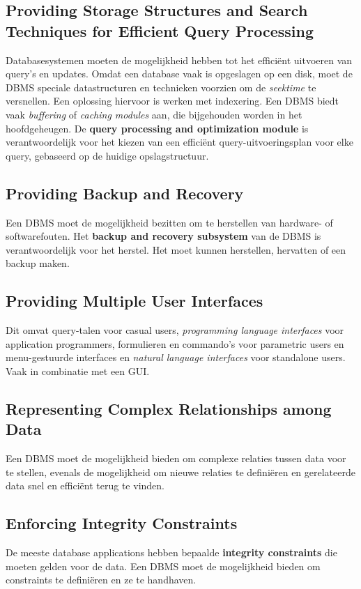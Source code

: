 \subsection{Providing Storage Structures and Search Techniques for Efficient Query Processing}
Databasesystemen moeten de mogelijkheid hebben tot het effici\"ent uitvoeren van query's en updates. Omdat een database vaak is opgeslagen op een disk, moet de DBMS speciale datastructuren en technieken voorzien om de \textit{seektime} te versnellen. Een oplossing hiervoor is werken met indexering. Een DBMS biedt vaak \textit{buffering} of \textit{caching modules} aan, die bijgehouden worden in het hoofdgeheugen. De \textbf{query processing and optimization module} is verantwoordelijk voor het kiezen van een effici\"ent query-uitvoeringsplan voor elke query, gebaseerd op de huidige opslagstructuur.

\subsection{Providing Backup and Recovery}
Een DBMS moet de mogelijkheid bezitten om te herstellen van hardware- of softwarefouten. Het \textbf{backup and recovery subsystem} van de DBMS is verantwoordelijk voor het herstel. Het moet kunnen herstellen, hervatten of een backup maken.

\subsection{Providing Multiple User Interfaces}
Dit omvat query-talen voor casual users, \textit{programming language interfaces} voor application programmers, formulieren en commando's voor parametric users en menu-gestuurde interfaces en \textit{natural language interfaces} voor standalone users. Vaak in combinatie met een GUI.

\subsection{Representing Complex Relationships among Data}
Een DBMS moet de mogelijkheid bieden om complexe relaties tussen data voor te stellen, evenals de mogelijkheid om nieuwe relaties te defini\"eren en gerelateerde data snel en effici\"ent terug te vinden.

\subsection{Enforcing Integrity Constraints}
De meeste database applications hebben bepaalde \textbf{integrity constraints} die moeten gelden voor de data. Een DBMS moet de mogelijkheid bieden om constraints te defini\"eren en ze te handhaven.

